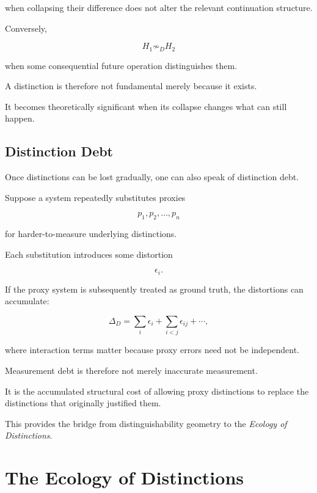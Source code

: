 \documentclass[11pt]{article}
\theoremstyle{remark}
\begin{document}
when collapsing their difference does not alter the relevant continuation structure.

Conversely,

\begin{equation}
H_1
\not\sim_D
H_2
\end{equation}

when some consequential future operation distinguishes them.

A distinction is therefore not fundamental merely because it exists.

It becomes theoretically significant when its collapse changes what can still happen.

\subsection{Distinction Debt}

Once distinctions can be lost gradually, one can also speak of distinction debt.

Suppose a system repeatedly substitutes proxies

\begin{equation}
p_1,p_2,\ldots,p_n
\end{equation}

for harder-to-measure underlying distinctions.

Each substitution introduces some distortion

\begin{equation}
\epsilon_i.
\end{equation}

If the proxy system is subsequently treated as ground truth, the distortions can accumulate:

\begin{equation}
\Delta_D
=
\sum_i\epsilon_i
+
\sum_{i<j}\epsilon_{ij}
+\cdots,
\end{equation}

where interaction terms matter because proxy errors need not be independent.

Measurement debt is therefore not merely inaccurate measurement.

It is the accumulated structural cost of allowing proxy distinctions to replace the distinctions that originally justified them.

This provides the bridge from distinguishability geometry to the \emph{Ecology of Distinctions}.

\section{The Ecology of Distinctions}
\end{document}
